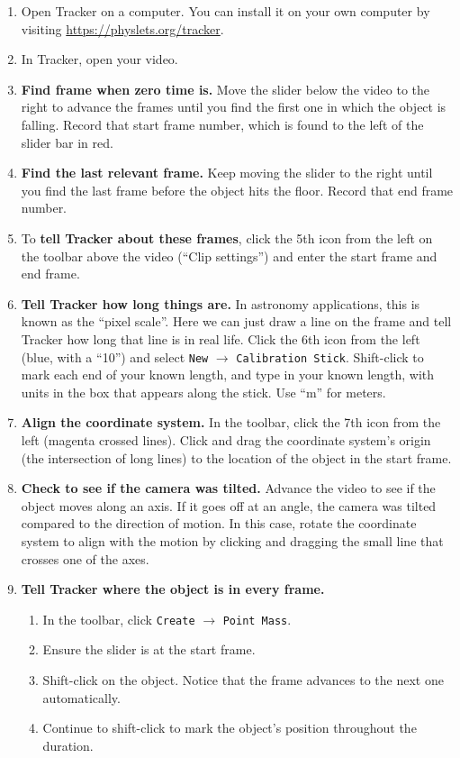\begin{enumerate}
	\item Open Tracker on a computer. You can install it on your own computer by visiting \url{https://physlets.org/tracker}.
	
	\item In Tracker, open your video.
	
	\item \textbf{Find frame when zero time is.} Move the slider below the video to the right to advance the frames until you find the first one in which the object is falling. Record that start frame number, which is found to the left of the slider bar in red.
	
	\item \textbf{Find the last relevant frame.} Keep moving the slider to the right until you find the last frame before the object hits the floor. Record that end frame number.
	
	\item To \textbf{tell Tracker about these frames}, click the 5th icon from the left on the toolbar above the video (``Clip settings'') and enter the start frame and end frame.
	
	\item \textbf{Tell Tracker how long things are.} In astronomy applications, this is known as the ``pixel scale''. Here we can just draw a line on the frame and tell Tracker how long that line is in real life. Click the 6th icon from the left (blue, with a ``10'') and select \texttt{New} $\rightarrow$ \texttt{Calibration Stick}. Shift-click to mark each end of your known length, and type in your known length, with units in the box that appears along the stick. Use ``m'' for meters.
	
	\item \textbf{Align the coordinate system.} In the toolbar, click the 7th icon from the left (magenta crossed lines). Click and drag the coordinate system's origin (the intersection of long lines) to the location of the object in the start frame.
	
	\item \textbf{Check to see if the camera was tilted.} Advance the video to see if the object moves along an axis. If it goes off at an angle, the camera was tilted compared to the direction of motion. In this case, rotate the coordinate system to align with the motion by clicking and dragging the small line that crosses one of the axes.
	
	\item \textbf{Tell Tracker where the object is in every frame.}
	\begin{enumerate}
		\item In the toolbar, click \texttt{Create} $\rightarrow$ \texttt{Point Mass}.
		\item Ensure the slider is at the start frame.
		\item Shift-click on the object. Notice that the frame advances to the next one automatically.
		\item Continue to shift-click to mark the object's position throughout the duration.
	\end{enumerate}
\end{enumerate}

